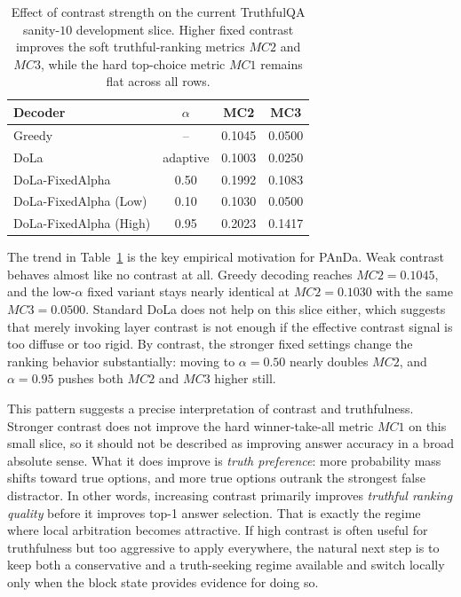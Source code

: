 \documentclass[10pt,twocolumn]{article}
\begin{document}
\begin{table}[t]
\centering
\footnotesize
\begin{tabular}{lccc}
\toprule
Decoder & \(\alpha\) & MC2 & MC3 \\
\midrule
Greedy & -- & 0.1045 & 0.0500 \\
DoLa & adaptive & 0.1003 & 0.0250 \\
DoLa-FixedAlpha & 0.50 & 0.1992 & 0.1083 \\
DoLa-FixedAlpha (Low) & 0.10 & 0.1030 & 0.0500 \\
DoLa-FixedAlpha (High) & 0.95 & 0.2023 & 0.1417 \\
\bottomrule
\end{tabular}
\caption{Effect of contrast strength on the current TruthfulQA sanity-\(10\) development slice. Higher fixed contrast improves the soft truthful-ranking metrics \(MC2\) and \(MC3\), while the hard top-choice metric \(MC1\) remains flat across all rows.}
\label{tab:contrast-sweep}
\end{table}

The trend in Table~\ref{tab:contrast-sweep} is the key empirical motivation for PAnDa. Weak contrast behaves almost like no contrast at all. Greedy decoding reaches \(MC2 = 0.1045\), and the low-\(\alpha\) fixed variant stays nearly identical at \(MC2 = 0.1030\) with the same \(MC3 = 0.0500\). Standard DoLa does not help on this slice either, which suggests that merely invoking layer contrast is not enough if the effective contrast signal is too diffuse or too rigid. By contrast, the stronger fixed settings change the ranking behavior substantially: moving to \(\alpha = 0.50\) nearly doubles \(MC2\), and \(\alpha = 0.95\) pushes both \(MC2\) and \(MC3\) higher still.

This pattern suggests a precise interpretation of contrast and truthfulness. Stronger contrast does not improve the hard winner-take-all metric \(MC1\) on this small slice, so it should not be described as improving answer accuracy in a broad absolute sense. What it does improve is \emph{truth preference}: more probability mass shifts toward true options, and more true options outrank the strongest false distractor. In other words, increasing contrast primarily improves \emph{truthful ranking quality} before it improves top-1 answer selection. That is exactly the regime where local arbitration becomes attractive. If high contrast is often useful for truthfulness but too aggressive to apply everywhere, the natural next step is to keep both a conservative and a truth-seeking regime available and switch locally only when the block state provides evidence for doing so.
\end{document}
